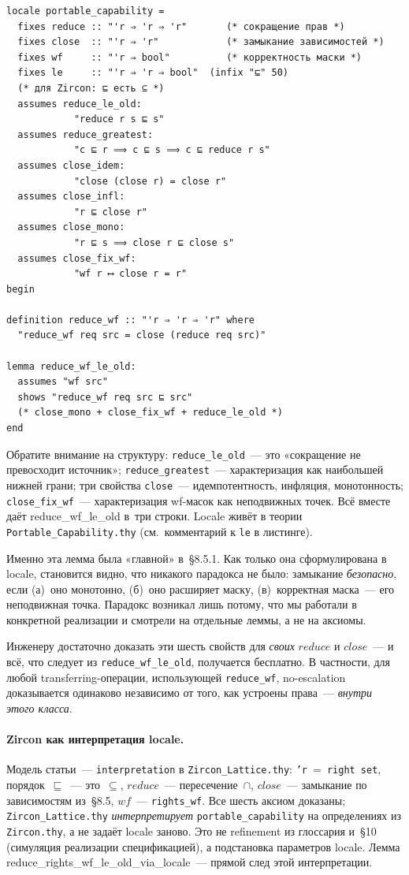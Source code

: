 \documentclass[11pt,a4paper]{article}
\newcommand{\isabel}[1]{{\isabelleit #1}}
\newcommand{\lemmaname}[1]{\isabel{#1}}
\begin{document}
\begin{lstlisting}
locale portable_capability =
  fixes reduce :: "'r ⇒ 'r ⇒ 'r"       (* сокращение прав *)
  fixes close  :: "'r ⇒ 'r"            (* замыкание зависимостей *)
  fixes wf     :: "'r ⇒ bool"          (* корректность маски *)
  fixes le     :: "'r ⇒ 'r ⇒ bool"  (infix "⊑" 50)
  (* для Zircon: ⊑ есть ⊆ *)
  assumes reduce_le_old:
            "reduce r s ⊑ s"
  assumes reduce_greatest:
            "c ⊑ r ⟹ c ⊑ s ⟹ c ⊑ reduce r s"
  assumes close_idem:
            "close (close r) = close r"
  assumes close_infl:
            "r ⊑ close r"
  assumes close_mono:
            "r ⊑ s ⟹ close r ⊑ close s"
  assumes close_fix_wf:
            "wf r ⟷ close r = r"
begin

definition reduce_wf :: "'r ⇒ 'r ⇒ 'r" where
  "reduce_wf req src = close (reduce req src)"

lemma reduce_wf_le_old:
  assumes "wf src"
  shows "reduce_wf req src ⊑ src"
  (* close_mono + close_fix_wf + reduce_le_old *)
end
\end{lstlisting}

Обратите внимание на структуру: \texttt{reduce\_le\_old}~--- это
«сокращение не превосходит источник»; \texttt{reduce\_greatest}~---
характеризация как наибольшей нижней грани; три свойства
\texttt{close}~--- идемпотентность, инфляция, монотонность;
\texttt{close\_fix\_wf}~--- характеризация wf-масок как неподвижных
точек. Всё вместе даёт \lemmaname{reduce\_wf\_le\_old} в~три строки.
Locale живёт в теории \texttt{Portable\_Capability.thy}
(см.~комментарий к \texttt{le} в листинге).

Именно эта лемма была «главной» в~§8.5.1. Как только она сформулирована в
locale, становится видно, что никакого парадокса не было: замыкание
\emph{безопасно}, если (а)~оно монотонно, (б)~оно расширяет маску,
(в)~корректная маска~--- его неподвижная точка. Парадокс возникал лишь
потому, что мы работали в конкретной реализации и смотрели на отдельные
леммы, а не на аксиомы.

Инженеру достаточно доказать эти шесть свойств для \emph{своих}
$\mathit{reduce}$ и $\mathit{close}$~--- и всё, что следует из
\texttt{reduce\_wf\_le\_old}, получается бесплатно. В частности, для любой
transferring-операции, использующей \texttt{reduce\_wf}, no-escalation
доказывается одинаково независимо от того, как устроены права~---
\emph{внутри этого класса}.

\paragraph{Zircon как интерпретация locale.}
Модель статьи~--- \texttt{interpretation} в
\texttt{Zircon\_Lattice.thy}:
\texttt{'r}~=~\texttt{right set},
порядок~$\sqsubseteq$~--- это~$\subseteq$,
$\mathit{reduce}$~--- пересечение~$\cap$,
$\mathit{close}$~--- замыкание по зависимостям из~§8.5,
$\mathit{wf}$~--- \texttt{rights\_wf}.
Все шесть аксиом доказаны; \texttt{Zircon\_Lattice.thy}
\emph{интерпретирует} \texttt{portable\_capability} на определениях из
\texttt{Zircon.thy}, а не задаёт locale заново. Это не refinement из
глоссария и~§10 (симуляция реализации спецификацией), а подстановка
параметров locale. Лемма
\lemmaname{reduce\_rights\_wf\_le\_old\_via\_locale}~--- прямой след
этой интерпретации.
\end{document}
